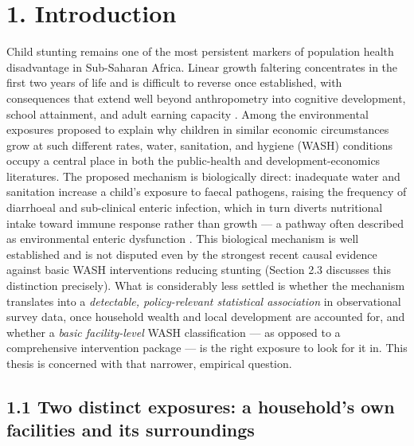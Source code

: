 \section*{1. Introduction}

Child stunting remains one of the most persistent markers of population health disadvantage in Sub-Saharan Africa. Linear growth faltering concentrates in the first two years of life and is difficult to reverse once established, with consequences that extend well beyond anthropometry into cognitive development, school attainment, and adult earning capacity \parencite{Victora2008,Victora2010,Black2013}. Among the environmental exposures proposed to explain why children in similar economic circumstances grow at such different rates, water, sanitation, and hygiene (WASH) conditions occupy a central place in both the public-health and development-economics literatures. The proposed mechanism is biologically direct: inadequate water and sanitation increase a child's exposure to faecal pathogens, raising the frequency of diarrhoeal and sub-clinical enteric infection, which in turn diverts nutritional intake toward immune response rather than growth --- a pathway often described as environmental enteric dysfunction \parencite{CummingCairncross2016}. This biological mechanism is well established and is not disputed even by the strongest recent causal evidence against basic WASH interventions reducing stunting (Section 2.3 discusses this distinction precisely). What is considerably less settled is whether the mechanism translates into a \textit{detectable, policy-relevant statistical association} in observational survey data, once household wealth and local development are accounted for, and whether a \textit{basic facility-level} WASH classification --- as opposed to a comprehensive intervention package --- is the right exposure to look for it in. This thesis is concerned with that narrower, empirical question.

\subsection*{1.1 Two distinct exposures: a household's own facilities and its surroundings}

